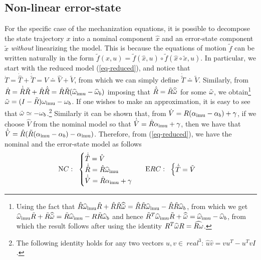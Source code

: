 {\subsection{Non-linear error-state}
%
For the specific case of the mechanization equations, it is possible to decompose the state trajectory $x$ into a nominal component $\hat x$ and an error-state component $\tilde x$ {\em without} linearizing the model. This is because the equations of motion $\tilde f$ can be written naturally in the form $\tilde f(x, u) = \tilde f(\hat x, u)\circ \tilde f(\hat x\circ \tilde x, u)$. In particular, we start with the reduced model (\ref{eq-reduced}), and notice that $\dot T = \dot {\hat T} + \dot {\tilde T} = V \doteq \hat V + \tilde V$, from which we can simply define $\dot {\tilde T} \doteq \tilde V$. 
%
Similarly, from $\dot R = \dot {\hat R} {\tilde R} + \hat R \dot{\tilde R} = \hat R \tilde R(\widehat {\omega}_\mathrm{imu} -{\widehat{\omega}}_b)$ imposing that $\dot{\tilde R} = \tilde R \widehat{\tilde{\omega}}$ for some $\tilde{\omega}$, we obtain\footnote{Using the fact that $\hat R \widehat {\omega}_\mathrm{imu}  \tilde R + \hat R \tilde R \widehat{\tilde{\omega}} = \hat R \tilde R {\widehat{\omega}}_\mathrm{imu}  - \hat R \tilde R \widehat {\omega}_b$, from which we get $\widehat {\omega}_\mathrm{imu}  \tilde R + \tilde R \widehat{\tilde{\omega}} = \tilde R {\widehat{\omega}}_\mathrm{imu}  - R \tilde R \widehat {\omega}_b$ and hence ${\tilde R}^T \widehat {\omega}_\mathrm{imu}  \tilde R + \widehat{\tilde{\omega}} =  {\widehat{\omega}}_\mathrm{imu}  - \widehat {\omega}_b$, from which the result follows after using the identity $R^T\widehat {\omega} R = \widehat{R\omega}$.} $\tilde{\omega} = (I- \tilde R) \omega_\mathrm{imu}  - \omega_b$. If one wishes to make an approximation, it is easy to see that $\tilde{\omega} \simeq -\omega_b$.\footnote{The following identity holds for any two vectors $u, v \in 
\
real^3$: $\widehat u \widehat v = v u^T - u^T v I$.} Similarly it can be shown that, from $\dot V = R(\alpha_\mathrm{imu}  - \alpha_b) + \gamma$, if we choose $\hat V$ from the nominal model so that $\dot{\hat V} = \hat R\alpha_\mathrm{imu}  + \gamma$, then we have that $\dot{\tilde V} = \hat R(\tilde R(\alpha_\mathrm{imu}  - \alpha_b) - \alpha_\mathrm{imu} )$. Therefore, from (\ref{eq-reduced}), we have the nominal and the error-state model as follows
\begin{equation}
{\mathrm NC:}~~
\begin{cases}
\dot{\hat T} = \hat V \\ 
\dot{\hat R} = \hat R \widehat {\omega}_\mathrm{imu}  \\
\dot{\hat V} = \hat R\alpha_\mathrm{imu}  + \gamma
\end{cases}
~~ {\mathrm ERC:}~~
\begin{cases}
\dot{\tilde T} = \tilde V \\

\end{cases}
\end{equation}}
